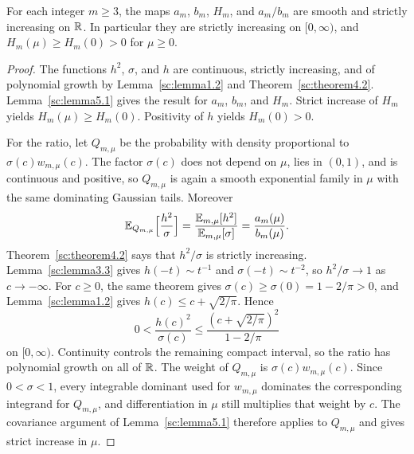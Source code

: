 \begin{lemma}\label{sc:lemma5.2}
For each integer \(m\ge 3\), the maps \(a_m\), \(b_m\), \(H_m\), and \(a_m/b_m\) are smooth and strictly increasing on \(\mathbb R\). In particular they are strictly increasing on \([0,\infty)\), and \(H_m(\mu)\ge H_m(0)>0\) for \(\mu\ge 0\).

\end{lemma}
\begin{proof}
The functions \(h^2\), \(\sigma\), and \(h\) are continuous, strictly increasing, and of polynomial growth by Lemma~\ref{sc:lemma1.2} and Theorem~\ref{sc:theorem4.2}. Lemma~\ref{sc:lemma5.1} gives the result for \(a_m\), \(b_m\), and \(H_m\). Strict increase of \(H_m\) yields \(H_m(\mu)\ge H_m(0)\). Positivity of \(h\) yields \(H_m(0)>0\).

For the ratio, let \(Q_{m,\mu}\) be the probability with density proportional to \(\sigma(c)w_{m,\mu}(c)\). The factor \(\sigma(c)\) does not depend on \(\mu\), lies in \((0,1)\), and is continuous and positive, so \(Q_{m,\mu}\) is again a smooth exponential family in \(\mu\) with the same dominating Gaussian tails. Moreover
\[
\mathbb E_{Q_{m,\mu}}\Bigl[\frac{h^2}{\sigma}\Bigr]=\frac{\mathbb E_{m,\mu}[h^2]}{\mathbb E_{m,\mu}[\sigma]}=\frac{a_m(\mu)}{b_m(\mu)}.
\]
Theorem~\ref{sc:theorem4.2} says that \(h^2/\sigma\) is strictly increasing. Lemma~\ref{sc:lemma3.3} gives \(h(-t)\sim t^{-1}\) and \(\sigma(-t)\sim t^{-2}\), so \(h^2/\sigma\to 1\) as \(c\to-\infty\). For \(c\ge 0\), the same theorem gives \(\sigma(c)\ge\sigma(0)=1-2/\pi>0\), and Lemma~\ref{sc:lemma1.2} gives \(h(c)\le c+\sqrt{2/\pi}\). Hence
\[
0<\frac{h(c)^2}{\sigma(c)}\le\frac{(c+\sqrt{2/\pi})^2}{1-2/\pi}
\]
on \([0,\infty)\). Continuity controls the remaining compact interval, so the ratio has polynomial growth on all of \(\mathbb R\). The weight of \(Q_{m,\mu}\) is \(\sigma(c)w_{m,\mu}(c)\). Since \(0<\sigma<1\), every integrable dominant used for \(w_{m,\mu}\) dominates the corresponding integrand for \(Q_{m,\mu}\), and differentiation in \(\mu\) still multiplies that weight by \(c\). The covariance argument of Lemma~\ref{sc:lemma5.1} therefore applies to \(Q_{m,\mu}\) and gives strict increase in \(\mu\).

\end{proof}

